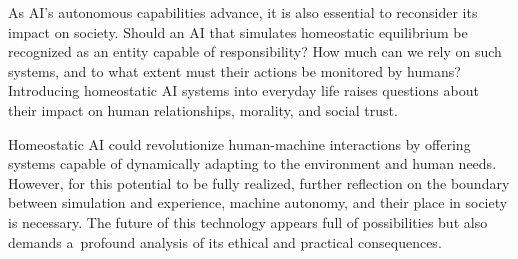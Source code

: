 \documentclass[%
  manuscript=article,
  year=2024,
  volume=77,
  doi=10.59203/zfn.77.706,
]{zfn}
\begin{document}
As AI's autonomous capabilities advance, it is also essential to reconsider its impact on society. Should an AI that simulates homeostatic equilibrium be recognized as an entity capable of responsibility? How much can we rely on such systems, and to what extent must their actions be monitored by humans? Introducing homeostatic AI systems into everyday life raises questions about their impact on human relationships, morality, and social trust.



Homeostatic AI could revolutionize human-machine interactions by offering systems capable of dynamically adapting to the environment and human needs. However, for this potential to be fully realized, further reflection on the boundary between simulation and experience, machine autonomy, and their place in society is necessary. The future of this technology appears full of possibilities but also demands a~profound analysis of its ethical and practical consequences.




\printbibliography
\end{document}
